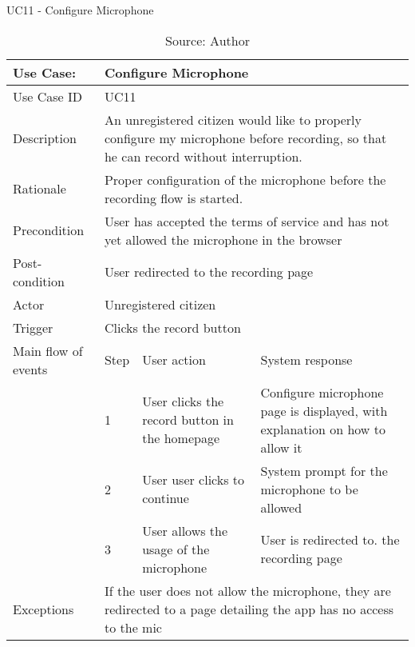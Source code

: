 \begin{table}[h]
\centering
\caption{UC11 - Configure Microphone}
\label{uc:11}
\begin{tabular}{|p{3cm}|p{1cm}|p{5cm}|p{5cm}|}
\hline
Use Case:       & \multicolumn{3}{p{11cm}|}{Configure Microphone} \\ \hline
Use Case ID     & \multicolumn{3}{p{11cm}|}{UC11} \\ \hline
Description     & \multicolumn{3}{p{11cm}|}{An unregistered citizen would like to properly configure my microphone before recording, so that he can record without interruption.} \\ \hline
Rationale       & \multicolumn{3}{p{11cm}|}{Proper configuration of the microphone before the recording flow is started.} \\ \hline
Precondition    & \multicolumn{3}{p{11cm}|}{User has accepted the terms of service and has not yet allowed the microphone in the browser} \\ \hline
Post-condition  & \multicolumn{3}{p{11cm}|}{User redirected to the recording page} \\ \hline
Actor           & \multicolumn{3}{p{11cm}|}{Unregistered citizen} \\ \hline
Trigger         & \multicolumn{3}{p{11cm}|}{Clicks the record button} \\ \hline
Main flow of events & Step  & User action & System response \\ \hline
                    & 1     & User clicks the record button in the homepage & Configure microphone page is displayed, with explanation on how to allow it \\ \hline
                    & 2     & User user clicks to continue & System prompt for the microphone to be allowed \\ \hline
                    & 3     & User allows the usage of the microphone & User is redirected to. the recording page \\ \hline
Exceptions      & \multicolumn{3}{p{11cm}|}{If the user does not allow the microphone, they are redirected to a page detailing the app has no access to the mic} \\ \hline
\end{tabular}
\caption*{Source: Author}
\end{table}

